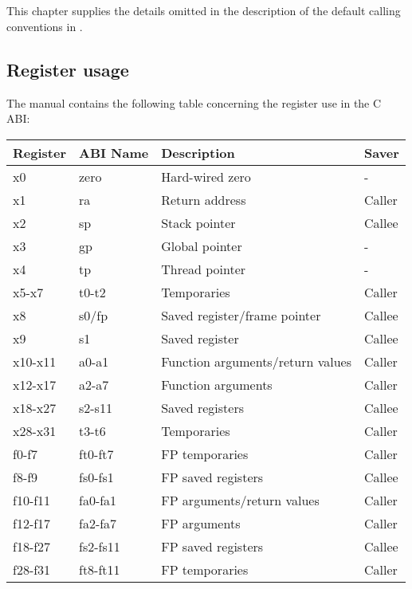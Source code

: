 \chapter{\riscv{}}
\label{chapter-backend-risc-v}

This chapter supplies the details omitted in the description of the
default calling conventions in .

\section{Register usage}
\label{sec-backend-risc-v-register-usage}

The \riscv{} manual contains the following table concerning the register
use in the C ABI:

{\small
\begin{tabular}{|l|l|l|l|}
  \hline
  Register & ABI Name & Description & Saver\\
  \hline
  \hline
  x0 & zero & Hard-wired zero & -\\
  x1 & ra & Return address & Caller\\
  x2 & sp & Stack pointer & Callee\\
  x3 & gp & Global pointer & -\\
  x4 & tp & Thread pointer & -\\
  x5-x7 & t0-t2 & Temporaries & Caller\\
  x8 & s0/fp & Saved register/frame pointer & Callee\\
  x9 & s1 & Saved register & Callee\\
  x10-x11 & a0-a1 & Function arguments/return values & Caller\\
  x12-x17 & a2-a7 & Function arguments & Caller\\
  x18-x27 & s2-s11 & Saved registers & Callee\\
  x28-x31 & t3-t6 & Temporaries & Caller\\
  \hline
  f0-f7 & ft0-ft7 & FP temporaries & Caller\\
  f8-f9 & fs0-fs1 & FP saved registers & Callee\\
  f10-f11 & fa0-fa1 & FP arguments/return values & Caller\\
  f12-f17 & fa2-fa7 & FP arguments & Caller\\
  f18-f27 & fs2-fs11 & FP saved registers & Callee\\
  f28-f31 & ft8-ft11 & FP temporaries & Caller\\
  \hline
\end{tabular}}

